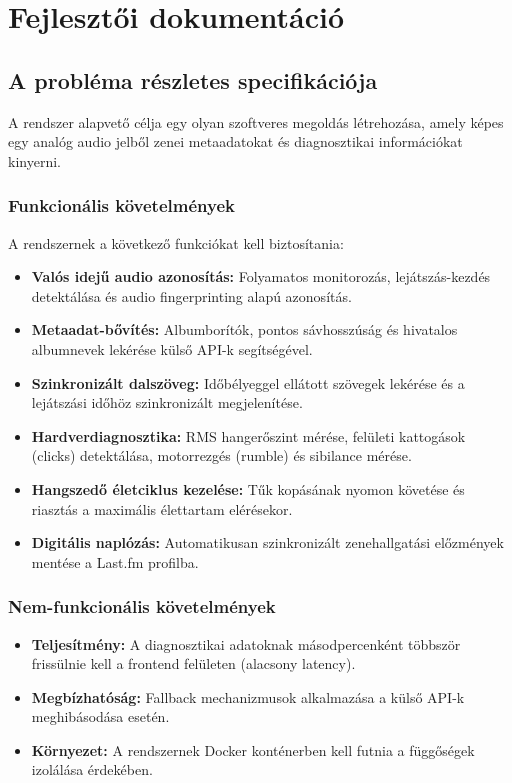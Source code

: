 \documentclass[12pt,a4paper,hungarian]{report}
\begin{document}
\chapter{Fejlesztői dokumentáció}

\section{A probléma részletes specifikációja}
A rendszer alapvető célja egy olyan szoftveres megoldás létrehozása, amely képes egy analóg audio jelből zenei metaadatokat és diagnosztikai információkat kinyerni. 

\subsection{Funkcionális követelmények}
A rendszernek a következő funkciókat kell biztosítania:
\begin{itemize}
    \item \textbf{Valós idejű audio azonosítás:} Folyamatos monitorozás, lejátszás-kezdés detektálása és audio fingerprinting alapú azonosítás.
    \item \textbf{Metaadat-bővítés:} Albumborítók, pontos sávhosszúság és hivatalos albumnevek lekérése külső API-k segítségével.
    \item \textbf{Szinkronizált dalszöveg:} Időbélyeggel ellátott szövegek lekérése és a lejátszási időhöz szinkronizált megjelenítése.
    \item \textbf{Hardverdiagnosztika:} RMS hangerőszint mérése, felületi kattogások (clicks) detektálása, motorrezgés (rumble) és sibilance mérése.
    \item \textbf{Hangszedő életciklus kezelése:} Tűk kopásának nyomon követése és riasztás a maximális élettartam elérésekor.
    \item \textbf{Digitális naplózás:} Automatikusan szinkronizált zenehallgatási előzmények mentése a Last.fm profilba.
\end{itemize}

\subsection{Nem-funkcionális követelmények}
\begin{itemize}
    \item \textbf{Teljesítmény:} A diagnosztikai adatoknak másodpercenként többször frissülnie kell a frontend felületen (alacsony latency).
    \item \textbf{Megbízhatóság:} Fallback mechanizmusok alkalmazása a külső API-k meghibásodása esetén.
    \item \textbf{Környezet:} A rendszernek Docker konténerben kell futnia a függőségek izolálása érdekében.
\end{itemize}
\end{document}
